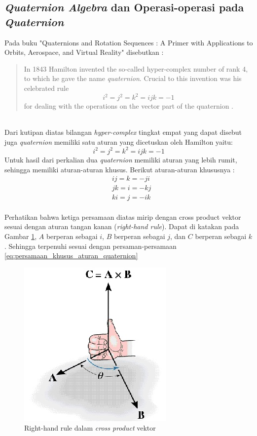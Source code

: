 \subsection{\textit{Quaternion Algebra} dan Operasi-operasi pada \textit{Quaternion}}
Pada buku "Quaternions and Rotation Sequences : A Primer with Applications to Orbits, Aerospace, and Virtual Reality" disebutkan :
\begin{quote}
In 1843 Hamilton invented the so-called hyper-complex number of rank 4, to which he gave the name \textit{quaternion}. Crucial to this invention was his celebrated rule
\[
	i^2 = j^2 = k^2 = ijk = -1
\]
for dealing with the operations on the vector part of the quaternion .
\end{quote}\cite{kuipers:1999}\\
Dari kutipan diatas bilangan \textit{hyper-complex} tingkat empat yang dapat disebut juga \textit{quaternion} memiliki satu aturan yang dicetuskan oleh Hamilton yaitu:
\[
	i^2 = j^2 = k^2 = ijk = -1
\]
Untuk hasil dari perkalian dua \textit{quaternion} memiliki aturan yang lebih rumit, sehingga memiliki aturan-aturan khusus. Berikut aturan-aturan khususnya :
\begin{equation}
	\begin{split}
	& ij = k = -ji\\
	& jk = i = -kj\\
	& ki = j = -ik	
	\end{split}
\label{eq:persamaan_khusus_aturan_quaternion}
\end{equation}\\
Perhatikan bahwa ketiga persamaan diatas mirip dengan cross product vektor sesuai dengan aturan tangan kanan (\textit{right-hand rule}). Dapat di katakan pada Gambar \ref{fig:right-hand-rule}, \(A\) berperan sebagai \(i\), \(B\) berperan sebagai \(j\), dan \(C\) berperan sebagai \(k\). Sehingga terpenuhi sesuai dengan persaman-persamaan \ref{eq:persamaan_khusus_aturan_quaternion}\\
\begin{figure}[htbp]
\centering
\includegraphics[scale=1]{Gambar/right-hand-rule}
\caption[Right-hand rule dalam \textit{cross product} vektor]{Right-hand rule dalam \textit{cross product} vektor} 
\label{fig:right-hand-rule}
\end{figure}\\
